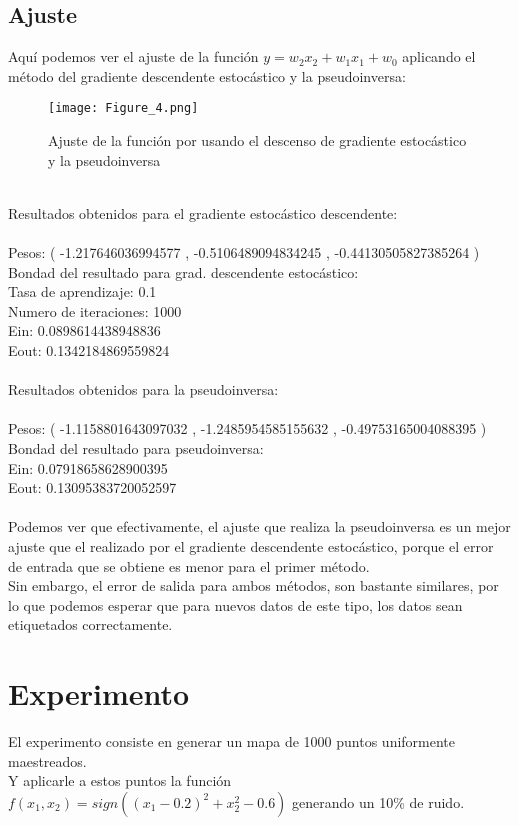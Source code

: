 \subsection{Ajuste}
Aquí podemos ver el ajuste de la función $ y = w_{2}x_{2} + w_{1}x_{1} + w_{0} $ aplicando el método del gradiente descendente estocástico y la pseudoinversa:
\begin{figure}[h]
   \centering
   \texttt{[image: Figure\_4.png]}
   \caption{Ajuste de la función por usando el descenso de gradiente estocástico y la pseudoinversa}
\end{figure}
\\
Resultados obtenidos para el gradiente estocástico descendente:\\
\\
Pesos: ( -1.217646036994577 ,  -0.5106489094834245 ,  -0.44130505827385264 )\\
Bondad del resultado para grad. descendente estocástico:\\
Tasa de aprendizaje:  0.1\\
Numero de iteraciones:  1000\\
Ein:  0.0898614438948836\\
Eout:  0.1342184869559824\\
\\
Resultados obtenidos para la pseudoinversa:\\
\\
Pesos: ( -1.1158801643097032 ,  -1.2485954585155632 ,  -0.49753165004088395 )\\
Bondad del resultado para pseudoinversa:\\
Ein:  0.07918658628900395\\
Eout:  0.13095383720052597\\
\\
Podemos ver que efectivamente, el ajuste que realiza la pseudoinversa es un mejor ajuste que el realizado por el gradiente descendente estocástico, porque el error de entrada que se obtiene es menor para el primer método.\\
Sin embargo, el error de salida para ambos métodos, son bastante similares, por lo que podemos esperar que para nuevos datos de este tipo, los datos sean etiquetados correctamente.


\section{Experimento}
El experimento consiste en generar un mapa de 1000 puntos uniformente maestreados.\\
Y aplicarle a estos puntos la función $ f(x_{1},x_{2}) = sign((x_{1}-0.2)^{2} + x_{2}^{2} - 0.6) $ generando un 10\% de ruido.

